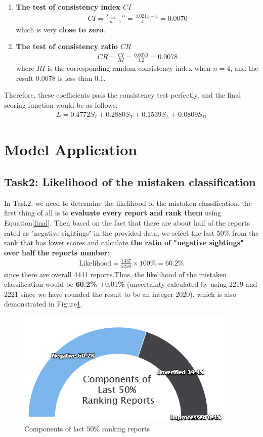 \documentclass{mcmthesis}
\begin{document}
	\begin{enumerate}
		\item \textbf{The test of consistency index $CI$}\\
		\begin{align*}
			CI = \frac{\lambda_{max}-n}{n-1} = \frac{4.0211-4}{4-1} = 0.0070
		\end{align*}
	which is very \textbf{close to zero}.
		\item \textbf{The test of consistency ratio $CR$}\\
		\begin{align*}
			CR = \frac{CI}{RI} = \frac{0.0070}{1.2} = 0.0078
		\end{align*}
	where $RI$ is the corresponding random consistency index when $n=4$, and the result 0.0078 is less than 0.1.
	\end{enumerate}
	Therefore, these coefficients pass the consistency test perfectly, and the final scoring function would be as follows:
	\begin{align}
		L = 0.4772S_I + 0.2880S_T + 0.1539S_L + 0.0809S_D
		\label{final}
	\end{align}
	\section{Model Application}
	\subsection{Task2: Likelihood of the mistaken classification}
	\quad In Task2, we need to determine the likelihood of the mistaken classification, the first thing of all is to \textbf{evaluate every report and rank them} using Equation\ref{final}. Then based on the fact that there are about half of the reports rated as "negative sightings" in the provided data, we select the last 50\% from the rank that has lower scores and calculate \textbf{the ratio of "negative sightings" over half the reports number}:
	\begin{align*}
		\text{Likelihood} = \frac{1337}{2220}
		\times 100\% = 60.2\% 
	\end{align*}
	since there are overall 4441 reports.Thus, the likelihood of the mistaken classification would be \textbf{60.2\% $\pm 0.01$\%} (uncertainty calculated by using 2219 and 2221 since we have rounded the result to be an integer 2020), which is also demonstrated in Figure\ref{t2}.
	\begin{figure}[h]
		\centering
		\includegraphics[scale=0.85]{task2.png}
		\caption{Components  of last 50\% ranking reports}
		\label{t2}
	\end{figure}
\end{document}
